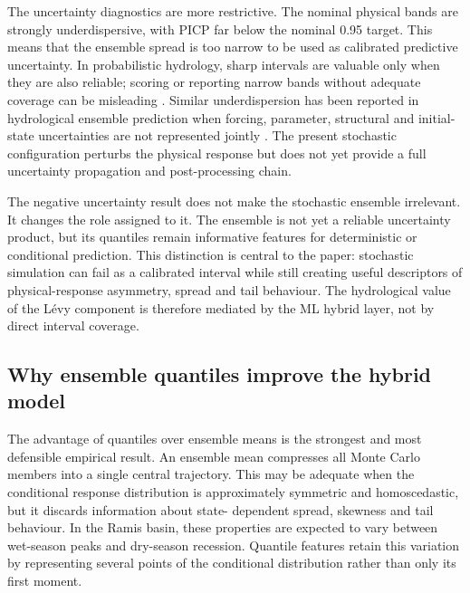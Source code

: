 \documentclass[a4paper,fleqn]{cas-sc}
\begin{document}
The uncertainty diagnostics are more restrictive. The nominal physical
bands are strongly underdispersive, with PICP far below the nominal
0.95 target. This means that the ensemble spread is too narrow to be
used as calibrated predictive uncertainty. In probabilistic hydrology,
sharp intervals are valuable only when they are also reliable; scoring
or reporting narrow bands without adequate coverage can be misleading
\citep{atger1999skill,franz2011evaluating,papacharalampous2022review}. Similar underdispersion has been reported in hydrological ensemble
prediction when forcing, parameter, structural and initial-state
uncertainties are not represented jointly
\citep{demirel2013effect,thiboult2016accounting,crochemore2016bias}.
The present stochastic configuration perturbs the physical response but does not yet
provide a full uncertainty propagation and post-processing chain.

The negative uncertainty result does not make the stochastic ensemble
irrelevant. It changes the role assigned to it. The ensemble is not yet
a reliable uncertainty product, but its quantiles remain informative
features for deterministic or conditional prediction. This distinction
is central to the paper: stochastic simulation can fail as a calibrated
interval while still creating useful descriptors of physical-response
asymmetry, spread and tail behaviour. The hydrological value of the
L\'{e}vy component is therefore mediated by the ML hybrid layer, not by
direct interval coverage.

\subsection{Why ensemble quantiles improve the hybrid model}
\label{subsec:discussion-hybrid}

The advantage of quantiles over ensemble means is the strongest and
most defensible empirical result. An ensemble mean compresses all
Monte Carlo members into a single central trajectory. This may be
adequate when the conditional response distribution is approximately
symmetric and homoscedastic, but it discards information about state-
dependent spread, skewness and tail behaviour. In the Ramis basin,
these properties are expected to vary between wet-season peaks and
dry-season recession. Quantile features retain this variation by
representing several points of the conditional distribution rather than
only its first moment.
\end{document}
